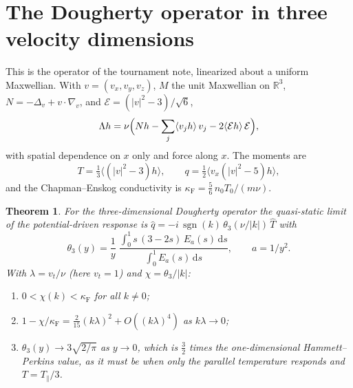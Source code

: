 \documentclass[11pt]{article}
\newcommand{\dd}{\mathrm{d}}
\newcommand{\sgn}{\operatorname{sgn}}
\newcommand{\avg}[1]{\langle #1\rangle}
\newcommand{\vt}{v_t}
\newtheorem{theorem}{Theorem}
\theoremstyle{remark}
\begin{document}
\section{The Dougherty operator in three velocity dimensions}

This is the operator of the tournament note, linearized about a uniform
Maxwellian. With $v=(v_x,v_y,v_z)$, $M$ the unit Maxwellian on
$\mathbb{R}^3$, $N=-\Delta_v+v\cdot\nabla_v$, and
$\mathcal{E}=(|v|^2-3)/\sqrt6$,
\begin{equation}
  \Lambda h = \nu\Bigl(Nh-\sum_{j}\avg{v_jh}\,v_j
     -2\avg{\mathcal{E}h}\,\mathcal{E}\Bigr),
\end{equation}
with spatial dependence on $x$ only and force along $x$. The moments are
\[
  T=\tfrac13\avg{(|v|^2-3)h},\qquad
  q=\tfrac12\avg{v_x(|v|^2-5)h},
\]
and the Chapman--Enskog conductivity is
$\kappa_{\mathrm F}=\tfrac56\,n_0T_0/(m\nu)$.

\begin{theorem}\label{thm:3d}
For the three-dimensional Dougherty operator the quasi-static limit of the
potential-driven response is $\hat q=-i\,\sgn(k)\,\theta_3(\nu/|k|)\,\hat T$
with
\begin{equation}
  \theta_3(y) = \frac1y\;
  \frac{\int_0^1s\,(3-2s)\,E_a(s)\,\dd s}{\int_0^1E_a(s)\,\dd s},
  \qquad a=1/y^2 .
  \label{eq:th3}
\end{equation}
With $\lambda=\vt/\nu$ (here $\vt=1$) and $\chi=\theta_3/|k|$:
\begin{enumerate}
  \item[(a)] $0<\chi(k)<\kappa_{\mathrm F}$ for all $k\ne0$;
  \item[(b)] $1-\chi/\kappa_{\mathrm F}
     =\tfrac{2}{15}(k\lambda)^2+O((k\lambda)^4)$ as $k\lambda\to0$;
  \item[(c)] $\theta_3(y)\to3\sqrt{2/\pi}$ as $y\to0$, which is
    $\tfrac32$ times the one-dimensional Hammett--Perkins value, as it must
    be when only the parallel temperature responds and $T=T_\parallel/3$.
\end{enumerate}
\end{theorem}
\end{document}
